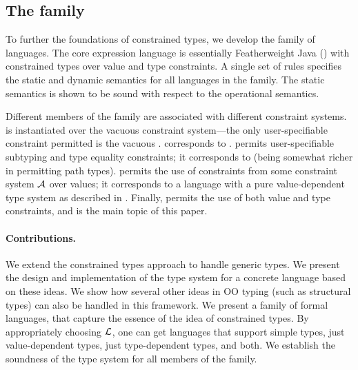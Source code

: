 
\subsection{The  family}
To further the foundations of constrained types, we develop the
\FXG
family of languages. The core expression language is essentially
Featherweight Java (\FJ \cite{FJ}) with constrained types over
value and type constraints.
A single set of rules specifies the static and dynamic
semantics for all languages in the family.  The static semantics is
shown to be sound with respect to the operational semantics.

Different members of the family are associated with different
constraint systems. \FXGZ{} is
\FXG{} instantiated over the vacuous constraint system---the only
user-specifiable constraint permitted is the vacuous .  \FXGZ{}
corresponds to \FJ. \FXG{} permits user-specifiable subtyping
and type equality constraints; it corresponds to
\FGJ{} (being somewhat richer in permitting path types).  permits
the use of constraints from some constraint system $\cal A$ over
values; it
corresponds to a language with a pure value-dependent type system as
described in \cite{constrained-types}. Finally,  permits the
use of both value and type constraints,
and is the main topic of this paper.


\paragraph{Contributions.}
We extend the constrained types approach to handle generic types.  We
present the design and implementation of the type system for a
concrete language \Xten{} based on these ideas. We show how several
other ideas in OO typing (such as structural types) can also be
handled in this framework. We present a family of formal languages,
 that capture the essence of the idea of constrained
types. By appropriately choosing $\cal L$, one can get languages that
support simple types, just value-dependent types, just type-dependent
types, and both. We establish the soundness of the type system for all
members of the family.

